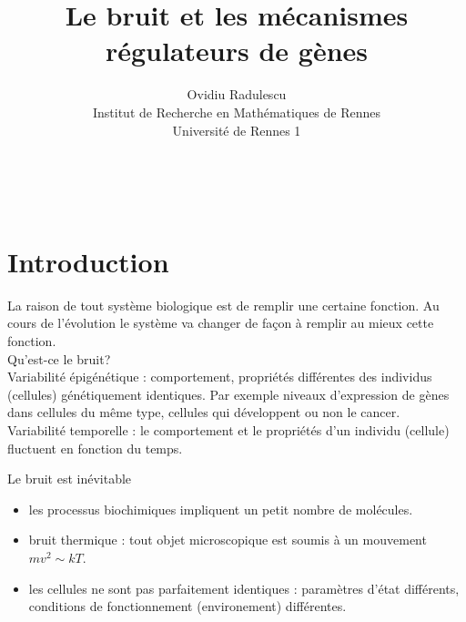 \documentclass{article}
\def\red{\color{red}}
\def\magenta{\color{goldenrod}}
\def\mblue{\color{MidnightBlue}}
\def\nblue{\color{NavyBlue}}
\begin{document}
\title{
{\bf \Huge \textsf{\mblue Le bruit et les m{\'e}canismes r{\'e}gulateurs de g{\`e}nes
}}} \\


\author{ \nblue \Large
Ovidiu Radulescu \\
Institut de Recherche en Math{\'e}matiques de Rennes \\
Universit{\'e} de Rennes 1 }




\maketitle





\pagebreak



\chapter{\magenta \textsf{\huge Introduction }}

\nblue \Large

La raison de tout syst{\`e}me biologique est de remplir une certaine
fonction. Au cours de l'{\'e}volution le syst{\`e}me va changer de fa{\c c}on
{\`a} remplir au mieux cette fonction. \\



{\red Qu'est-ce le bruit?} \\

Variabilit{\'e} {\'e}pig{\'e}n{\'e}tique : comportement, propri{\'e}t{\'e}s diff{\'e}rentes
des individus (cellules) g{\'e}n{\'e}tiquement identiques. Par exemple
niveaux d'expression de g{\`e}nes dans cellules du m{\^e}me type, cellules
qui d{\'e}veloppent ou
non le cancer. \\

Variabilit{\'e} temporelle : le comportement et le propri{\'e}t{\'e}s d'un individu (cellule)
fluctuent en fonction du temps.



{\red Le bruit est in{\'e}vitable }

\begin{itemize} \mblue \large
\item
les processus biochimiques impliquent un petit nombre de mol{\'e}cules.
\item
bruit thermique : tout objet microscopique est soumis {\`a} un mouvement
$mv^2 \sim kT$.
\item
les cellules ne sont pas parfaitement identiques : param{\`e}tres d'{\'e}tat
diff{\'e}rents, conditions de fonctionnement (environement) diff{\'e}rentes.
\end{itemize}
\end{document}
